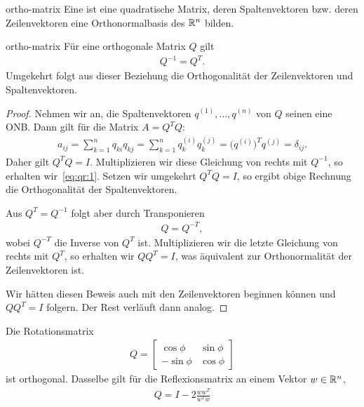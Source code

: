 \begin{Definition}{ortho-matrix}
  Eine  ist eine quadratische Matrix, deren
  Spaltenvektoren bzw. deren Zeilenvektoren eine Orthonormalbasis des
  $\mathbb R^n$ bilden.
\end{Definition}

\begin{Satz}{ortho-matrix}
  Für eine orthogonale Matrix $Q$ gilt
  \begin{gather}
    \label{eq:qr:1}
    Q^{-1} = Q^T.
  \end{gather}
  Umgekehrt folgt aus dieser Beziehung die Orthogonalität der
  Zeilenvektoren und Spaltenvektoren.
\end{Satz}

\begin{proof}
  Nehmen wir an, die Spaltenvektoren $q^{(1)},\dots,q^{(n)}$ von $Q$
  seinen eine ONB. Dann gilt für die Matrix $A = Q^TQ$:
  \begin{gather}
    a_{ij} = \sum_{k=1}^n q_{ki}q_{kj}
    = \sum_{k=1}^n q^{(i)}_k q^{(j)}_k
    = \bigl(q^{(i)}\bigr)^T q^{(j)} = \delta_{ij}.
  \end{gather}
  Daher gilt $Q^TQ=I$.  Multiplizieren wir diese Gleichung von rechts
  mit $Q^{-1}$, so erhalten wir~\eqref{eq:qr:1}. Setzen wir umgekehrt
  $Q^TQ=I$, so ergibt obige Rechnung die Orthogonalität der
  Spaltenvektoren.

  Aus $Q^T = Q^{-1}$ folgt aber durch Transponieren
  \begin{gather}
    Q = Q^{-T},
  \end{gather}
  wobei $Q^{-T}$ die Inverse von $Q^T$ ist. Multiplizieren wir die
  letzte Gleichung von rechts mit $Q^T$, so erhalten wir $QQ^T = I$,
  was äquivalent zur Orthonormalität der Zeilenvektoren ist.

  Wir hätten diesen Beweis auch mit den Zeilenvektoren beginnen können
  und $QQ^T=I$ folgern. Der Rest verläuft dann analog.
\end{proof}

\begin{example}
  Die Rotationsmatrix
  \begin{gather}
    Q = \begin{bmatrix}
      \cos \phi & \sin \phi\\-\sin\phi&\cos\phi
    \end{bmatrix}
  \end{gather}
  ist orthogonal. Dasselbe gilt für die Reflexionsmatrix an einem
  Vektor $w\in \mathbb R^n$,
  \begin{gather}
    Q = I-2\frac{ww^T}{w^Tw}
  \end{gather}
\end{example}

